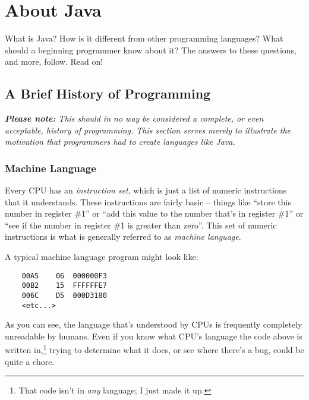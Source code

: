 
\chapter{About Java}

\minitoc

What is Java?  How is it different from other programming languages?  What should a beginning programmer know about it?  The answers to these questions, and more, follow.  Read on!

\section{A Brief History of Programming}

\textit{\textbf{Please note:} This should in no way be considered a complete, or even acceptable, history of programming.  This section serves merely to illustrate the motivation that programmers had to create languages like Java.}

\subsection{Machine Language}

Every CPU has an \textit{instruction set}, which is just a list of numeric instructions that it understands.  These instructions are fairly basic -- things like ``store this number in register \#1'' or ``add this value to the number that's in register \#1'' or ``see if the number in register \#1 is greater than zero''.  This set of numeric instructions is what is generally referred to as \textit{machine language}.

A typical machine language program might look like:

\begin{minipage}{\textwidth}
\begin{verbatim}
    00A5    06  000000F3
    00B2    15  FFFFFFE7
    006C    D5  000D3180
    <etc...>
\end{verbatim}
\end{minipage}

As you can see, the language that's understood by CPUs is frequently completely unreadable by humans.  Even if you know what CPU's language the code above is written in,\footnote{That code isn't in \textit{any} language; I just made it up.} trying to determine what it does, or see where there's a bug, could be quite a chore.

